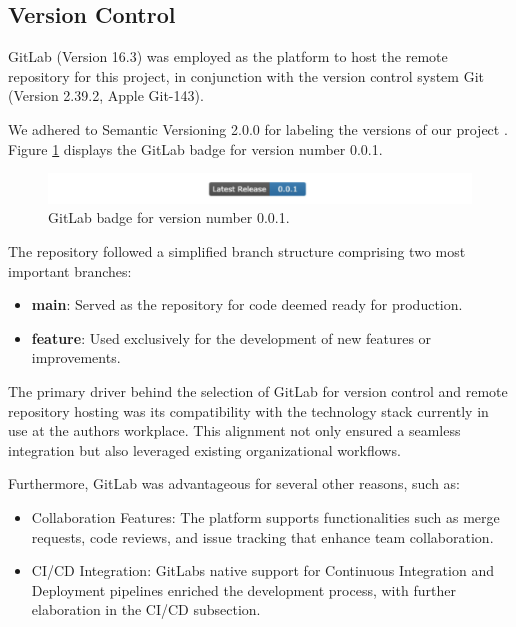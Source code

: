 \subsection{Version Control}\label{version-control}

GitLab (Version 16.3) was employed as the platform to host the remote
repository for this project, in conjunction with the version control
system Git (Version 2.39.2, Apple Git-143).

We adhered to Semantic Versioning 2.0.0 for labeling the versions of our
project \cite{42}. Figure \ref{fig:badge}
displays the GitLab badge for version number 0.0.1.

\begin{figure}[ht]
  \centering
  \includegraphics[width=\textwidth]{media/fig4.png}
  \caption{GitLab badge for version number 0.0.1.}
  \label{fig:badge}
\end{figure}


The repository followed a simplified branch structure comprising two
most important branches:

\begin{itemize}
\item
  \textbf{main}: Served as the repository for code deemed ready for
  production.
\item
  \textbf{feature}: Used exclusively for the development of new features
  or improvements.
\end{itemize}

The primary driver behind the selection of GitLab for version control
and remote repository hosting was its compatibility with the technology
stack currently in use at the author\textquotesingle s workplace. This
alignment not only ensured a seamless integration but also leveraged
existing organizational workflows.

Furthermore, GitLab was advantageous for several other reasons, such as:

\begin{itemize}
\item
  Collaboration Features: The platform supports functionalities such as
  merge requests, code reviews, and issue tracking that enhance team
  collaboration.
\item
  CI/CD Integration: GitLab\textquotesingle s native support for
  Continuous Integration and Deployment pipelines enriched the
  development process, with further elaboration in the CI/CD subsection.
\end{itemize}

